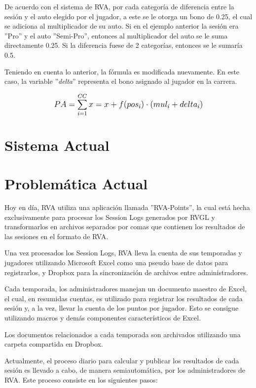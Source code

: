 De acuerdo con el sistema de RVA, por cada categoría de diferencia entre la sesión y el auto elegido por el jugador, a este se le otorga un bono de 0.25, el cual se adiciona al multiplicador de su auto. Si en el ejemplo anterior la sesión era ''Pro'' y el auto ''Semi-Pro'', entonces al multiplicador del auto se le suma directamente 0.25. Si la diferencia fuese de 2 categorías, entonces se le sumaría 0.5.

Teniendo en cuenta lo anterior, la fórmula es modificada nuevamente. En este caso, la variable ''\textit{delta}'' representa el bono asignado al jugador en la carrera.

\[
\mathlarger{{PA} = \sum_{i=1}^{CC}x=x+f(pos_i) \cdot \left(mul_i + delta_i\right)}
\]

\section{Sistema Actual}

\section{Problemática Actual}
Hoy en día,  RVA utiliza una aplicación llamada ''RVA-Points'', la cual está hecha exclusivamente para procesar los Session Logs generados por RVGL y transformarlos en archivos separados por comas que contienen los resultados de las sesiones en el formato de RVA.

Una vez procesados los Session Logs, RVA lleva la cuenta de sus temporadas y jugadores utilizando Microsoft Excel como una pseudo base de datos para registrarlos, y Dropbox para la sincronización de archivos entre administradores.

Cada temporada, los administradores manejan un documento maestro de Excel, el cual, en resumidas cuentas, es utilizado para registrar los resultados de cada sesión y, a la vez, llevar la cuenta de los puntos por jugador. Esto se consigue utilizando macros y demás componentes característicos de Excel.

Los documentos relacionados a cada temporada son archivados utilizando una carpeta compartida en Dropbox.

Actualmente, el proceso diario para calcular y publicar los resultados de cada sesión es llevado a cabo, de manera semiautomática, por los administradores de RVA. Este proceso consiste en los siguientes pasos:

